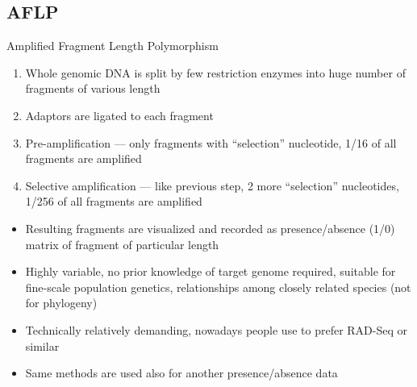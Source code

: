 \documentclass[compress, xelatex, 11pt, xcolor=svgnames, aspectratio=169,
	hyperref={
		bookmarks=true,
		unicode=true,
		colorlinks=true,
		pdftitle={Molecular data in R},
		plainpages=false,
		pdfauthor={Vojtech Zeisek},
		pdfsubject={Course about phylogeny and evolution in R},
		pdfcreator={XeLaTeX},
		pdfkeywords={R, evolution, phylogeny, molecular data},
		linkcolor=Crimson, %
		anchorcolor=Magenta, %
		citecolor=Magenta, %
		filecolor=Magenta, %
		menucolor=Magenta, %
		urlcolor=DodgerBlue, %
		},
	url={hyphens, lowtilde} %
	]{beamer}
\begin{document}
\subsection{AFLP}

\begin{frame}{Amplified Fragment Length Polymorphism}
	\begin{enumerate}
		\item Whole genomic DNA is split by few restriction enzymes into huge number of fragments of various length
		\item Adaptors are ligated to each fragment
		\item Pre-amplification --- only fragments with \enquote{selection} nucleotide, 1/16 of all fragments are amplified
		\item Selective amplification --- like previous step, 2 more \enquote{selection} nucleotides, 1/256 of all fragments are amplified
	\end{enumerate}
	\begin{itemize}
		\item Resulting fragments are visualized and recorded as presence/absence (1/0) matrix of fragment of particular length
		\item Highly variable, no prior knowledge of target genome required, suitable for fine-scale population genetics, relationships among closely related species (not for phylogeny)
		\item Technically relatively demanding, nowadays people use to prefer RAD-Seq or similar
		\item \alert{Same methods are used also for another presence/absence data}
	\end{itemize}
\end{frame}
\end{document}
